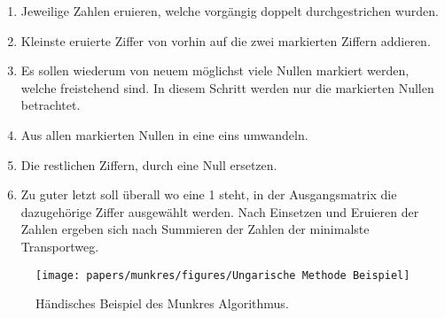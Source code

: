 \begin{enumerate}
\item Jeweilige Zahlen eruieren, welche vorgängig doppelt durchgestrichen wurden.

\item Kleinste eruierte Ziffer von vorhin auf die zwei markierten Ziffern addieren.

\item Es sollen wiederum von neuem möglichst viele Nullen markiert werden,
welche freistehend sind. In diesem Schritt werden nur die markierten Nullen betrachtet.

\item Aus allen markierten Nullen in eine eins umwandeln.

\item Die restlichen Ziffern, durch eine Null ersetzen.

\item Zu guter letzt soll überall wo eine 1 steht, in der Ausgangsmatrix die
dazugehörige Ziffer ausgewählt werden. Nach Einsetzen und Eruieren der Zahlen ergeben sich nach Summieren der Zahlen der minimalste Transportweg.
\end{enumerate}

\begin{figure}
\centering
\texttt{[image: papers/munkres/figures/Ungarische Methode Beispiel]}
\caption{Händisches Beispiel des Munkres Algorithmus.}
\label{munkres:Vr2}
\end{figure}
